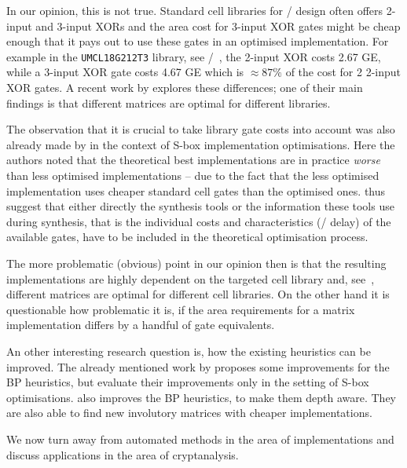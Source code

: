 In our opinion, this is not true.
Standard cell libraries for \ASIC/ design often offers 2-input and 3-input XORs and the area cost for 3-input XOR gates might be cheap enough that it pays out to use these gates in an optimised implementation.
For example in the \texttt{UMCL18G212T3} library, see \eg/~\cite[Table~2.1]{PhD:Poschmann09}, the 2-input XOR costs 2.67 GE, while a 3-input XOR gate costs 4.67 GE which is $\approx 87\%$ of the cost for 2 2-input XOR gates.
A recent work by \textcite{IWSEC:BanFunIso19} explores these differences; one of their main findings is that different matrices are optimal for different libraries.

The observation that it is crucial to take library gate costs into account was also already made by \textcite{TCHES:ReyTahAsh18} in the context of S-box implementation optimisations.
Here the authors noted that the theoretical best implementations are in practice \emph{worse} than less optimised implementations -- due to the fact that the less optimised implementation uses cheaper standard cell gates than the optimised ones.
\citeauthor{TCHES:ReyTahAsh18} thus suggest that either directly the synthesis tools or the information these tools use during synthesis, that is the individual costs and characteristics (\eg/ delay) of the available gates, have to be included in the theoretical optimisation process.

The more problematic (obvious) point in our opinion then is that the resulting implementations are highly dependent on the targeted cell library and, see~\cite{IWSEC:BanFunIso19}, different matrices are optimal for different cell libraries.
On the other hand it is questionable how problematic it is, if the area requirements for a matrix implementation differs by a handful of gate equivalents.

An other interesting research question is, how the existing heuristics can be improved.
The already mentioned work by \textcite{TCHES:ReyTahAsh18} proposes some improvements for the BP heuristics, but evaluate their improvements only in the setting of S-box optimisations.
\textcite{ToSC:LSLWH19} also improves the BP heuristics, to make them depth aware.
They are also able to find new involutory matrices with cheaper implementations.

We now turn away from automated methods in the area of implementations and discuss applications in the area of cryptanalysis.
